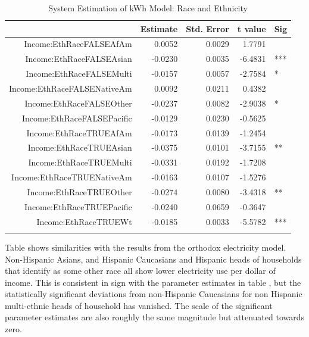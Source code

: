 \documentclass{article}
\begin{document}
{\small
\begin{longtable}{rrrrl}
\caption{System Estimation of kWh Model: Race and Ethnicity} \\ 
  \hline
 & Estimate & Std. Error & t value & Sig \\ 
  \hline
Income:EthRaceFALSEAfAm & 0.0052 & 0.0029 & 1.7791 &   \\ 
  Income:EthRaceFALSEAsian & -0.0230 & 0.0035 & -6.4831 & *** \\ 
  Income:EthRaceFALSEMulti & -0.0157 & 0.0057 & -2.7584 & * \\ 
  Income:EthRaceFALSENativeAm & 0.0092 & 0.0211 & 0.4382 &   \\ 
  Income:EthRaceFALSEOther & -0.0237 & 0.0082 & -2.9038 & * \\ 
  Income:EthRaceFALSEPacific & -0.0129 & 0.0230 & -0.5625 &   \\ 
  Income:EthRaceTRUEAfAm & -0.0173 & 0.0139 & -1.2454 &   \\ 
  Income:EthRaceTRUEAsian & -0.0375 & 0.0101 & -3.7155 & ** \\ 
  Income:EthRaceTRUEMulti & -0.0331 & 0.0192 & -1.7208 &   \\ 
  Income:EthRaceTRUENativeAm & -0.0163 & 0.0107 & -1.5276 &   \\ 
  Income:EthRaceTRUEOther & -0.0274 & 0.0080 & -3.4318 & ** \\ 
  Income:EthRaceTRUEPacific & -0.0240 & 0.0659 & -0.3647 &   \\ 
  Income:EthRaceTRUEWt & -0.0185 & 0.0033 & -5.5782 & *** \\ 
   \hline
\hline
\label{tab:SystemKWHEthnicity}
\end{longtable}
}
Table 
shows similarities with the results from the orthodox electricity model.  Non-Hispanic Asians, and Hispanic Caucasians and Hispanic heads of households that identify as some other race all show lower electricity use per dollar of income.   This is consistent in sign with the parameter estimates in table 
, but the statistically significant deviations from non-Hispanic Caucasians for non Hispanic multi-ethnic heads of household has vanished.  The scale of the significant parameter estimates are also roughly the same magnitude but attenuated towards zero.
\end{document}
